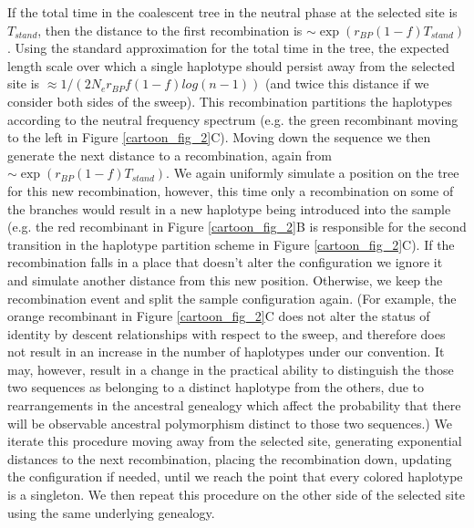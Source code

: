 \documentclass[a4paper,10pt]{article}
\begin{document}
If the total time in the coalescent tree in the neutral phase at the selected site is $T_{stand}$, then the distance to the first recombination is $\sim \exp \left( r_{BP}\left(1-f\right) T_{stand} \right)$. Using the standard approximation for the total time in the tree, the expected length scale over which a single haplotype should persist away from the selected site is $\approx 1/( 2 N_e r_{BP}f\left(1-f\right) log(n-1))$ (and twice this distance if we consider both sides of the sweep). This recombination partitions the haplotypes according to the neutral frequency spectrum (e.g. the green recombinant moving to the left in Figure \ref{cartoon_fig_2}C). Moving down the sequence we then generate the next distance to a recombination, again from $\sim \exp \left( r_{BP}\left(1-f\right) T_{stand} \right)$. We again uniformly simulate a position on the tree for this new recombination, however, this time only a recombination on some of the branches would result in a new haplotype being introduced into the sample (e.g. the red recombinant in Figure \ref{cartoon_fig_2}B is responsible for the second transition in the haplotype partition scheme in Figure \ref{cartoon_fig_2}C). If the recombination falls in a place that doesn't alter the configuration we ignore it and simulate another distance from this new position. Otherwise, we keep the recombination event and split the sample configuration again. (For example, the orange recombinant in Figure \ref{cartoon_fig_2}C does not alter the status of identity by descent relationships with respect to the sweep, and therefore does not result in an increase in the number of haplotypes under our convention. It may, however, result in a change in the practical ability to distinguish the those two sequences as belonging to a distinct haplotype from the others, due to rearrangements in the ancestral genealogy which affect the probability that there will be observable ancestral polymorphism distinct to those two sequences.) We iterate this procedure moving away from the selected site, generating exponential distances to the next recombination, placing the recombination down, updating the configuration if needed, until we reach the point that every colored haplotype is a singleton. We then repeat this procedure on the other side of the selected site using the same underlying genealogy.
\end{document}
